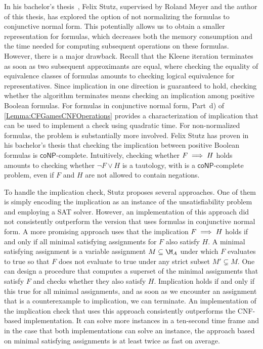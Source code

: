 \documentclass[../../diss.tex]{subfiles}
\begin{document}
In his bachelor's thesis~\cite{Stutz17}, Felix Stutz, supervised by Roland Meyer and the author of this thesis, has explored the option of not normalizing the formulas to conjunctive normal form.
This potentially allows us to obtain a smaller representation for formulas, which decreases both the memory consumption and the time needed for computing subsequent operations on these formulas.
However, there is a major drawback.
Recall that the Kleene iteration terminates as soon as two subsequent approximants are equal, where checking the equality of equivalence classes of formulas amounts to checking logical equivalence for representatives.
Since implication in one direction is guaranteed to hold, checking whether the algorithm terminates means checking an implication among positive Boolean formulas.
For formulas in conjunctive normal form, Part~d) of \cref{Lemma:CFGamesCNFOperations} provides a characterization of implication that can be used to implement a check using quadratic time.
For non-normalized formulas, the problem is substantially more involved.
Felix Stutz has proven in his bachelor's thesis that checking the implication between positive Boolean formulas is $\mathsf{coNP}$-complete.
Intuitively, checking whether $F \implies H$ holds amounts to checking whether $\neg F \vee H$ is a tautology, with is a $\mathsf{coNP}$-complete problem, even if $F$ and $H$ are not allowed to contain negations.

To handle the implication check, Stutz proposes several approaches.
One of them is simply encoding the implication as an instance of the unsatisfiability problem and employing a SAT solver.
However, an implementation of this approach did not consistently outperform the version that uses formulas in conjunctive normal form.
A more promising approach uses that the implication $F \implies H$ holds if and only if all minimal satisfying assignments for $F$ also satisfy $H$.
A minimal satisfying assignment is a variable assignment $M \subseteq \nfatransmonoid{A}$ under which $F$ evaluates to true so that $F$ does not evaluate to true under any strict subset $M' \subsetneq M$.
One can design a procedure that computes a superset of the minimal assignments that satisfy $F$ and checks whether they also satisfy $H$.
Implication holds if and only if this true for all minimal assignments, and as soon as we encounter an assignment that is a counterexample to implication, we can terminate.
An implementation of the implication check that uses this approach consistently outperforms the CNF-based implementation.
It can solve more instances in a ten-second time frame and in the case that both implementations can solve an instance, the approach based on minimal satisfying assignments is at least twice as fast on average.
\end{document}

